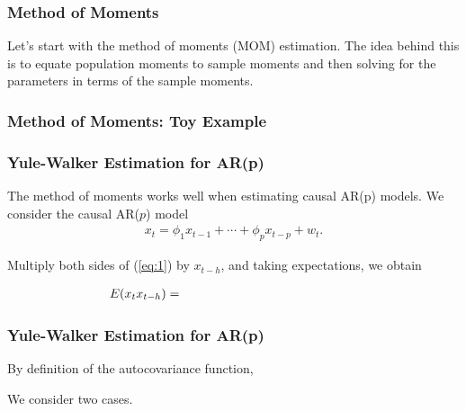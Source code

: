 \documentclass[%
xcolor=pdftex]{beamer}
\begin{document}
\begin{frame}
\frametitle{Method of Moments}

Let's start with the method of moments (MOM) estimation. The idea behind this is to equate population moments to sample moments and then solving for the parameters in terms of the sample moments.

\end{frame}

\begin{frame}
\frametitle{Method of Moments: Toy Example}



\end{frame}





\begin{frame}
\frametitle{Yule-Walker Estimation for AR(p)}

The method of moments works well when estimating causal AR(p) models. We consider the causal AR($p$) model
\begin{eqnarray}\label{eq:1}
x_t=\phi_1 x_{t-1} + \cdots + \phi_p x_{t-p} + w_t.
\end{eqnarray}

Multiply both sides of (\ref{eq:1}) by $x_{t-h}$, and taking expectations, we obtain

\begin{eqnarray}\label{eq:2}
E (x_t x_{t-h})  = \hspace{50mm}
\end{eqnarray}


\end{frame}

\begin{frame}
\frametitle{Yule-Walker Estimation for AR(p)}

By definition of the autocovariance function,

\vspace{40mm}

We consider two cases.


\end{frame}
\end{document}

